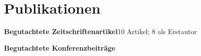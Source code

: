 \documentclass[10pt,a4paper]{article}
\begin{document}


\newpage
\section{Publikationen}
\textbf{Begutachtete Zeitschriftenartikel}\hfill 10 Artikel; 8 als Erstautor
\begingroup\small
\begin{enumerate}[leftmargin=1.9em,label=\arabic*.,itemsep=6pt,topsep=5pt]

\end{enumerate}
\vspace{4pt}
\textbf{Begutachtete Konferenzbeiträge}
\begin{enumerate}[leftmargin=1.9em,label=\arabic*.,itemsep=6pt,topsep=5pt]

\end{enumerate}
\endgroup
\end{document}
